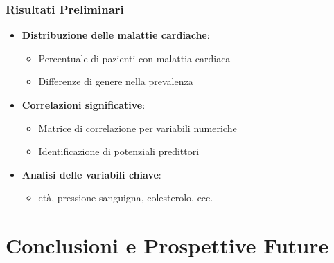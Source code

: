 \documentclass{beamer}
\begin{document}
\begin{frame}
\frametitle{Risultati Preliminari}
\begin{itemize}
    \item \textbf{Distribuzione delle malattie cardiache}:
    \begin{itemize}
        \item Percentuale di pazienti con malattia cardiaca
        \item Differenze di genere nella prevalenza
    \end{itemize}
    \item \textbf{Correlazioni significative}:
    \begin{itemize}
        \item Matrice di correlazione per variabili numeriche
        \item Identificazione di potenziali predittori
    \end{itemize}
    \item \textbf{Analisi delle variabili chiave}:
    \begin{itemize}
        \item età, pressione sanguigna, colesterolo, ecc.
    \end{itemize}
\end{itemize}
\end{frame}

\section{Conclusioni e Prospettive Future}
\end{document}
